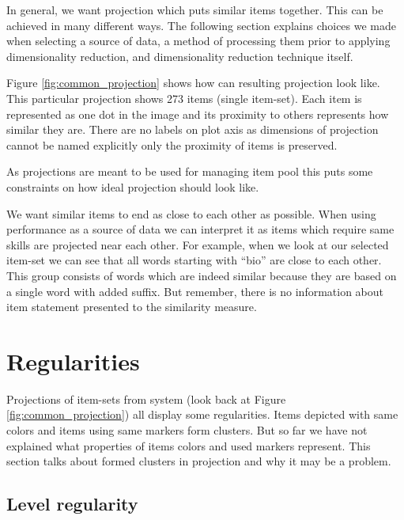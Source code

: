 \documentclass[
  digital, %
  table,   %
  nolof,     %
  nolot,     %
  nocover,
  color,
  final, %
]{fithesis3}
\begin{document}
In general, we want projection which puts similar items together. This can be achieved in many different ways. The following section explains choices we made when selecting a source of data, a method of processing them prior to applying dimensionality reduction, and dimensionality reduction technique itself.


Figure \ref{fig:common_projection} shows how can resulting projection look like. This particular projection shows 273 items (single item-set). Each item is represented as one dot in the image and its proximity to others represents how similar they are. There are no labels on plot axis as dimensions of projection cannot be named explicitly only the proximity of items is preserved.


As projections are meant to be used for managing item pool this puts some constraints on how ideal projection should look like.

We want similar items to end as close to each other as possible. When using performance as a source of data we can interpret it as items which require same skills are projected near each other. For example, when we look at our selected item-set we can see that all words starting with ``bio'' are close to each other. This group consists of words which are indeed similar because they are based on a single word with added suffix. But remember, there is no information about item statement presented to the similarity measure.


\section{Regularities}\label{regularities}


Projections of item-sets from system \umimeCesky{} (look back at Figure \ref{fig:common_projection}) all display some regularities. Items depicted with same colors and items using same markers form clusters. But so far we have not explained what properties of items colors and used markers represent. This section talks about formed clusters in projection and why it may be a problem.


\subsection{Level regularity}\label{regularities-level-regularity}
\end{document}

